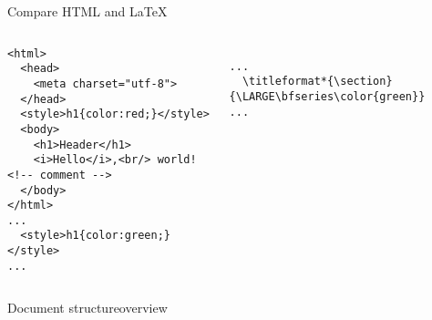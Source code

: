 \begin{frame}[fragile]{Compare HTML and \LaTeX }\relax
    \begin{columns}
        \begin{column}{0.5\textwidth}
\begin{verbatim}
<html>
  <head>
    <meta charset="utf-8">
  </head>
  <style>h1{color:red;}</style>
  <body>
    <h1>Header</h1>
    <i>Hello</i>,<br/> world!  <!-- comment -->
  </body>
</html>
...
  <style>h1{color:green;}</style>
...
\end{verbatim}
\end{column}
        \begin{column}{0.5\textwidth}
\inputminted{latex}{sec02/code/helloworld.tex}
\begin{verbatim}
...
  \titleformat*{\section}{\LARGE\bfseries\color{green}}
...
\end{verbatim}
\end{column}
    \end{columns}
\end{frame}

\cprotect{}
\begin{frame}[fragile]{Document structure}{overview}
\inputminted{latex}{sec02/code/structureOfDocument.tex}
    
\end{frame}

